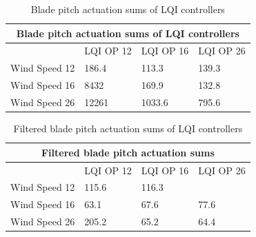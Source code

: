 \begin{table}[ht]
	\centering
	\caption{Blade pitch actuation sums of LQI controllers}
	\label{tab:pitch_sum_lqi}
	\begin{tabular}{@{}|llll|@{}}
		\toprule
		\multicolumn{4}{|c|}{Blade pitch actuation sums of LQI controllers}                                                                                                           \\ \midrule
		\multicolumn{1}{|l|}{}              & \multicolumn{1}{l|}{LQI OP 12}                     & \multicolumn{1}{l|}{LQI OP 16}                     & LQI OP 26                     \\ \midrule
		\multicolumn{1}{|l|}{Wind Speed 12} & \multicolumn{1}{l|}{\cellcolor[HTML]{FFCCC9}186.4} & \multicolumn{1}{l|}{\cellcolor[HTML]{9AFF99}113.3} & 139.3                         \\ \midrule
		\multicolumn{1}{|l|}{Wind Speed 16} & \multicolumn{1}{l|}{\cellcolor[HTML]{FFCCC9}8432}  & \multicolumn{1}{l|}{169.9}                         & \cellcolor[HTML]{9AFF99}132.8 \\ \midrule
		\multicolumn{1}{|l|}{Wind Speed 26} & \multicolumn{1}{l|}{\cellcolor[HTML]{FFCCC9}12261} & \multicolumn{1}{l|}{1033.6}                        & \cellcolor[HTML]{9AFF99}795.6 \\ \bottomrule
	\end{tabular}
\end{table}

\begin{table}[ht]
	\centering
	\caption{Filtered blade pitch actuation sums of LQI controllers}
	\label{tab:filt_pitch_sum_lqi}
	\begin{tabular}{@{}|llll|@{}}
		\toprule
		\multicolumn{4}{|c|}{Filtered blade pitch actuation sums}                                                                                                                        \\ \midrule
		\multicolumn{1}{|l|}{}              & \multicolumn{1}{l|}{LQI OP 12}                     & \multicolumn{1}{l|}{LQI OP 16} & LQI OP 26                                            \\ \midrule
		\multicolumn{1}{|l|}{Wind Speed 12} & \multicolumn{1}{l|}{\cellcolor[HTML]{9AFF99}115.6} & \multicolumn{1}{l|}{116.3}     & \cellcolor[HTML]{FFCCC9}{\color[HTML]{333333} 128.9} \\ \midrule
		\multicolumn{1}{|l|}{Wind Speed 16} & \multicolumn{1}{l|}{\cellcolor[HTML]{9AFF99}63.1}  & \multicolumn{1}{l|}{67.6}      & \cellcolor[HTML]{FFCCC9}77.6                         \\ \midrule
		\multicolumn{1}{|l|}{Wind Speed 26} & \multicolumn{1}{l|}{\cellcolor[HTML]{FFCCC9}205.2} & \multicolumn{1}{l|}{65.2}      & \cellcolor[HTML]{9AFF99}64.4                         \\ \bottomrule
	\end{tabular}
\end{table}


